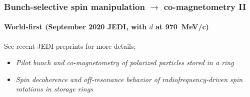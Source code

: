 \begin{frame}
 \frametitle{Bunch-selective spin manipulation $\rightarrow$ co-magnetometry II}
\framesubtitle{\textbf{World-first (September 2020 JEDI, with $d$ at \SI{970}{MeV/c}) }}

\vspace{-0.2cm}
See recent JEDI preprints for more details: 
\begin{footnotesize}
\begin{itemize}
	\item \textit{Pilot bunch and co-magnetometry of polarized particles stored in a ring}\,\textcolor{PineGreen}{\cite{Slim:2023lpd}}
	\item \textit{Spin decoherence and off-resonance behavior of radiofrequency-driven spin rotations in storage rings}\,\textcolor{PineGreen}{\cite{Nikolaev:2023srx}}
\end{itemize}
\end{footnotesize}

\vspace{-0.3cm}
\begin{columns}[T]



\end{columns}
\end{frame}
